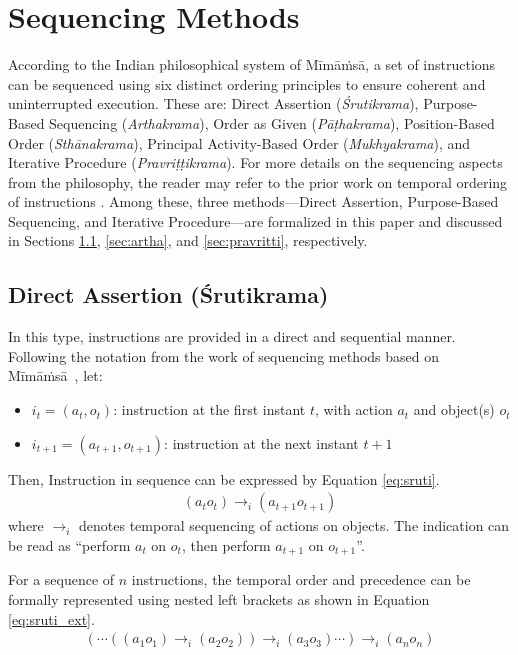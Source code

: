 \documentclass[a4paper,11pt]{lmcs}
\newcommand{\mimamsa}{M\={i}m\={a}\.ms\={a}}
\begin{document}
\section{Sequencing Methods}
\label{sec:sequencing}
According to the Indian philosophical system of \mimamsa, a set of instructions can be sequenced using six distinct ordering principles to ensure coherent and uninterrupted execution. These are: Direct Assertion (\textit{Śrutikrama}), Purpose-Based Sequencing (\textit{Arthakrama}), Order as Given (\textit{P\={a}\d{t}hakrama}), Position-Based Order (\textit{Sth\={a}nakrama}), Principal Activity-Based Order (\textit{Mukhyakrama}), and Iterative Procedure (\textit{Pravri\d{t}\d{t}ikrama}). For more details on the sequencing aspects from the philosophy, the reader may refer to the prior work on temporal ordering of instructions \cite{llm_mira}. Among these, three methods—Direct Assertion, Purpose-Based Sequencing, and Iterative Procedure—are formalized in this paper and discussed in Sections \ref{sec:sruti}, \ref{sec:artha}, and \ref{sec:pravritti}, respectively.


\subsection{Direct Assertion (\'{S}rutikrama)}
\label{sec:sruti}
In this type, instructions are provided in a direct and sequential manner. Following the notation from the work of sequencing methods based on \mimamsa~\cite{llm_mira}, let:
\begin{itemize}
 \item $i_t = (a_t,o_t)$: instruction at the first instant $t$, with action $a_t$ and object(s) $o_t$
\item $i_{t+1} = (a_{t+1},o_{t+1})$: instruction at the next instant $t+1$
 \end{itemize}
Then, Instruction in sequence can be expressed by Equation \ref{eq:sruti}.
\begin{eqnarray}
\label{eq:sruti}
 (a_t o_t) \rightarrow_i (a_{t+1}o_{t+1})
\end{eqnarray}
where $\rightarrow_i$ denotes temporal sequencing of actions on objects. The indication can be read as  ``perform $a_t$ on $o_t$, then perform $a_{t+1}$ on $o_{t+1}$''.

For a sequence of $n$ instructions, the temporal order and precedence can be formally represented using nested left brackets as shown in Equation \ref{eq:sruti_ext}.
\begin{eqnarray}
 \label{eq:sruti_ext}
(\cdots ((a_1 o_1) \rightarrow_i (a_2 o_2)) \rightarrow_i (a_3 o_3) \cdots ) \rightarrow_i (a_n o_n)
\end{eqnarray}
\end{document}
